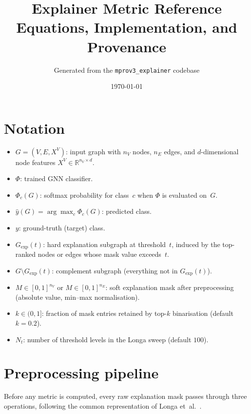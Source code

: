 \documentclass[11pt,a4paper]{article}
\title{Explainer Metric Reference\\[4pt]
\large Equations, Implementation, and Provenance}
\author{Generated from the \texttt{mprov3\_explainer} codebase}
\date{\today}
\newcommand{\model}{\Phi}
\newcommand{\Gexp}{G_{\mathrm{exp}}}
\newcommand{\Gcomp}{G \setminus G_{\mathrm{exp}}}
\begin{document}
\maketitle
\tableofcontents
\newpage

\section{Notation}

\begin{itemize}[nosep]
  \item $G = (V, E, X^V)$: input graph with $n_V$ nodes, $n_E$ edges, and
        $d$-dimensional node features $X^V \in \mathbb{R}^{n_V \times d}$.
  \item $\model$: trained GNN classifier.
  \item $\model_c(G)$: softmax probability for class~$c$ when $\model$ is
        evaluated on~$G$.
  \item $\hat{y}(G) = \arg\max_c \model_c(G)$: predicted class.
  \item $y$: ground-truth (target) class.
  \item $\Gexp(t)$: hard explanation subgraph at threshold~$t$, induced by the
        top-ranked nodes or edges whose mask value exceeds~$t$.
  \item $\Gcomp(t)$: complement subgraph (everything not in $\Gexp(t)$).
  \item $M \in [0,1]^{n_V}$ or $M \in [0,1]^{n_E}$: soft explanation mask
        after preprocessing (absolute value, min--max normalisation).
  \item $k \in (0,1]$: fraction of mask entries retained by top-$k$
        binarisation (default $k = 0.2$).
  \item $N_t$: number of threshold levels in the Longa sweep (default $100$).
\end{itemize}


\section{Preprocessing pipeline}
\label{sec:preprocessing}

Before any metric is computed, every raw explanation mask passes through three
operations, following the common representation of
Longa et~al.~\cite{longa2025}.
\end{document}
